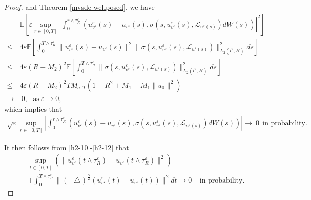 \documentclass[11pt]{article}
\numberwithin{equation}{section}
\theoremstyle{plain}
\def\leq{\leqslant}
\begin{document}
\begin{proof}
    and   Theorem \ref{mvsde-wellposed}, we have
    \begin{align*}
        &
        \mathbb{E}
        \left[
        \varepsilon
        \sup_{r \in [0,T]}
        \left|
        \int_{0}^{r \wedge \tau_R^\varepsilon}
        \left( u_{v^\varepsilon}^\varepsilon(s) - u_{v^\varepsilon}(s),
        \sigma(s, u_{v^\varepsilon}^\varepsilon(s), \mathcal{L}_{u^\varepsilon(s)} ) dW(s)
        \right)
        \right|^2
        \right] \nonumber \\
        \leq & 4 \varepsilon
        \mathbb{E}
        \left[ \int_{0}^{T \wedge \tau_R^\varepsilon}
        \| u_{v^\varepsilon}^\varepsilon(s) - u_{v^\varepsilon}(s)
        \|^2
        \| \sigma(s, u_{v^\varepsilon}^\varepsilon(s), \mathcal{L}_{u^\varepsilon(s)} ) \|_{L_2(l^2, H)}^2
        ds
        \right]  \nonumber \\
        \leq & 4 \varepsilon \left(R + M_2 \right)^2
        \mathbb{E}
        \left[ \int_{0}^{T \wedge \tau_R^\varepsilon}
        \| \sigma(s, u_{v^\varepsilon}^\varepsilon(s), \mathcal{L}_{u^\varepsilon(s)} ) \|_{L_2(l^2, H)}^2
        ds
        \right]  \nonumber \\
        \leq & 4 \varepsilon
        \left(R +M_2 \right)^2
        T M_{\sigma, T}
        \left( 1 +   R^2
        +M_1+M_1
        \|u_0\|^2
        \right) \nonumber \\
        \rightarrow & \  0, \ \ \  \text{as} \ \varepsilon \to 0,
    \end{align*}
    which implies that
    \begin{align} \label{h2-12}
        \sqrt{\varepsilon}
        \sup_{r \in [0,T]}
        \left| \int_{0}^{r \wedge \tau_R^\varepsilon}
        \left( u_{v^\varepsilon}^\varepsilon(s) - u_{v^\varepsilon}(s),
        \sigma(s, u_{v^\varepsilon}^\varepsilon(s), \mathcal{L}_{u^\varepsilon(s)} ) dW(s)
        \right)
        \right|
        \rightarrow  \  0   \ \   \text{in probability}.
    \end{align}


    It then follows from \eqref{h2-10}-\eqref{h2-12}  that
    \begin{align}\label{h2-13}
        & \sup_{t\in [0,T]}
        \left(
        \| u_{v^\varepsilon}^\varepsilon(t \wedge \tau_R^\varepsilon)
        - u_{v^\varepsilon}(t \wedge \tau_R^\varepsilon) \|^2
        \right)  \nonumber \\
        & + \int_0^{T \wedge \tau_R^\varepsilon}
        \| (-\triangle)^{\frac{\alpha}{2}}
        \left( u_{v^\varepsilon}^\varepsilon (t)
        - u_{v^\varepsilon}(t)
        \right)
        \|^2 dt
        \rightarrow 0 \ \ \ \ \   \text{in\ probability}.
    \end{align}


\end{proof}
\end{document}
